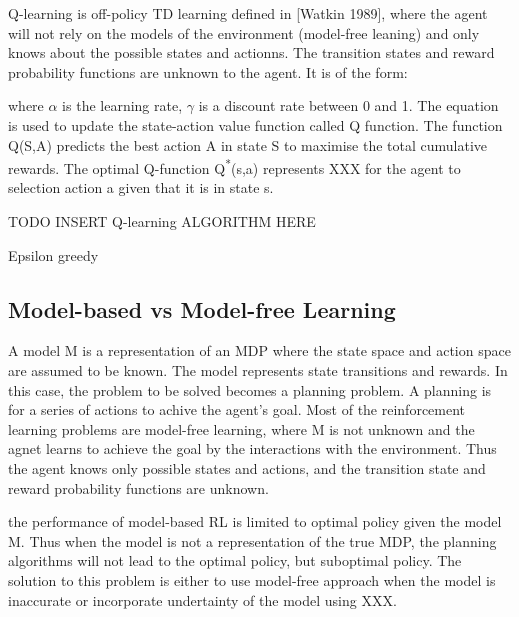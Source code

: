 \documentclass[12pt,twoside]{report}
\begin{document}
Q-learning is off-policy TD learning defined in [Watkin 1989], where the agent will not rely on the models of the environment (model-free leaning) and only knows about the possible states and actionns. The transition states and reward probability functions are unknown to the agent.
It is of the form:

%
where $\alpha$ is the learning rate, $\gamma$ is a discount rate between 0 and 1. The equation is used to update the state-action value function called Q function. The function Q(S,A) predicts the best action A in state S to maximise the total cumulative rewards.
The optimal Q-function Q\textsuperscript{*}(s,a) represents XXX for the agent to selection action a given that it is in state s.


TODO INSERT Q-learning ALGORITHM HERE

Epsilon greedy

\subsection{Model-based vs Model-free Learning}

A model M is a representation of an MDP where the state space and action space are assumed to be known. The model represents state transitions and rewards. In this case, the problem to be solved becomes a planning problem. A planning is for a series of actions to achive the agent's goal.
Most of the reinforcement learning problems are model-free learning, where M is not unknown and the agnet learns to achieve the goal by the interactions with the environment. Thus the agent knows only possible states and actions, and the transition state and reward probability functions are unknown.

the performance of model-based RL is limited to optimal policy given the model M. Thus when the model is not a representation of the true MDP, the planning algorithms will not lead to the optimal policy, but suboptimal policy. The solution to this problem is either to use model-free approach when the model is inaccurate or incorporate undertainty of the model using XXX.
\end{document}
